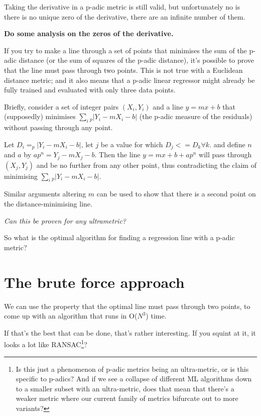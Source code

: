 \documentclass[a4paper,twocolumn, 10pt]{article}
\begin{document}
Taking the derivative in a p-adic metric is still valid, but 
unfortunately no is there is no unique zero of the derivative, there are
an infinite number of them.

\textbf{Do some analysis on the zeros of the derivative.}

If you try to make a line through a set of points that
minimises the sum of the p-adic distance (or the sum of squares of the p-adic
distance), it's possible to prove that the line must pass through two
points. This is not true with a Euclidean distance metric; and it also means
that a p-adic linear regressor might already be fully trained and evaluated
with only three data points.

Briefly, consider a set of integer pairs $(X_i, Y_i)$ and a line $y = mx + b$
that (supposedly) minimises $\sum_{i}{}_p|Y_i - m X_i - b|$ (the p-adic measure
of the residuals) without
passing through any point.

Let $D_i = _p|Y_i - m X_i - b|$, let $j$ be a value for which $D_j <= D_k \forall k$.
and define $n$ and $a$ by $a p^n = Y_j - m X_j -b$. Then the line
$y = mx + b + a p^n$ will pass through $(X_j, Y_j)$ and be no further from any
other point, thus contradicting the claim of minimising
$\sum_{i}{}_p|Y_i - m X_i - b|$.

Similar arguments altering $m$ can be used to show that there is a second point
on the distance-minimising line.

\textit{Can this be proven for any ultrametric?}

So what is the optimal algorithm for finding a regression line
with a p-adic metric?


\section{The brute force approach}

We can use the property that the
optimal line must pass through two points, to come up with an
algorithm that runs in O($N^3$) time.

If that's the best that can be done, that's rather interesting. If you
squint at it, it looks a lot like RANSAC\footnote{Is this just a
  phenomenon of p-adic metrics being an ultra-metric, or is this
  specific to p-adics? And if we see a collapse of different ML
  algorithms down to a smaller subset with an ultra-metric, does that
  mean that there's a weaker metric where our current family of
  metrics bifurcate out to more variants?}?
\end{document}
